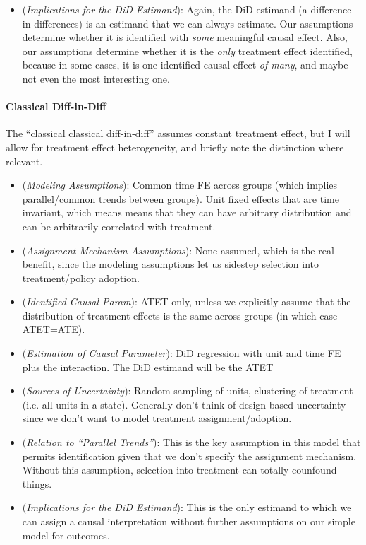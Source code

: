 \documentclass[12pt]{article}
\theoremstyle{plain}
\theoremstyle{definition}
\theoremstyle{remark}
\begin{document}
\begin{itemize}
  \item
    (\emph{Implications for the DiD Estimand}):
    Again, the DiD estimand (a difference in differences) is an estimand
    that we can always estimate.
    Our assumptions determine whether it is identified with \emph{some}
    meaningful causal effect.
    Also, our assumptions determine whether it is the \emph{only}
    treatment effect identified, because in some cases, it is one
    identified causal effect \emph{of many}, and maybe not even the most
    interesting one.
\end{itemize}
\paragraph{Classical Diff-in-Diff}
The ``classical classical diff-in-diff'' assumes constant treatment
effect, but I will allow for treatment effect heterogeneity, and briefly
note the distinction where relevant.
\begin{itemize}
  \item
    (\emph{Modeling Assumptions}):
    Common time FE across groups (which implies parallel/common trends
    between groups).
    Unit fixed effects that are time invariant, which means means that
    they can have arbitrary distribution and can be arbitrarily
    correlated with treatment.
  \item
    (\emph{Assignment Mechanism Assumptions}):
    None assumed, which is the real benefit, since the modeling
    assumptions let us sidestep selection into treatment/policy adoption.
  \item
    (\emph{Identified Causal Param}):
    ATET only, unless we explicitly assume that the distribution of
    treatment effects is the same across groups (in which case
    ATET=ATE).

  \item
    (\emph{Estimation of Causal Parameter}):
    DiD regression with unit and time FE plus the interaction.
    The DiD estimand will be the ATET

  \item
    (\emph{Sources of Uncertainty}):
    Random sampling of units, clustering of treatment (i.e. all units in
    a state).
    Generally don't think of design-based uncertainty since we don't
    want to model treatment assignment/adoption.

  \item
    (\emph{Relation to ``Parallel Trends''}):
    This is the key assumption in this model that permits identification
    given that we don't specify the assignment mechanism.
    Without this assumption, selection into treatment can totally
    counfound things.
  \item
    (\emph{Implications for the DiD Estimand}):
    This is the only estimand to which we can assign a causal
    interpretation without further assumptions on our simple model for
    outcomes.
\end{itemize}
\end{document}
